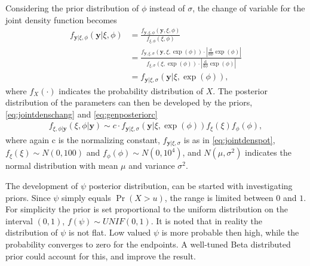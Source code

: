 Considering the prior distribution of $\phi$ instead of $\sigma$, the change of variable for the joint density function becomes 
\begin{align}
f_{\boldsymbol{y}|\xi,\phi}(\boldsymbol{y}|\xi,\phi)&=\frac{f_{\boldsymbol{y},\xi,\phi}(\boldsymbol{y},\xi,\phi)}{f_{\xi,\phi}(\xi,\phi)}\nonumber\\
&=\frac{f_{\boldsymbol{y},\xi,\sigma}\left(\boldsymbol{y},\xi,\exp(\phi)\right)\cdot \left|\frac{\mathrm d}{\mathrm d \phi} \exp(\phi)\right|}{f_{\xi,\sigma}\left(\xi,\exp(\phi)\right)\cdot \left|\frac{\mathrm d}{\mathrm d \phi} \exp(\phi)\right|}\nonumber\\
&=f_{\boldsymbol{y}|\xi,\sigma}\left(\boldsymbol{y}|\xi,\exp(\phi)\right), \label{eq:jointdenschang}
\end{align}
where $f_{X}(\cdot)$ indicates the probability distribution of $X$.
The posterior distribution of the parameters can then be developed by the priors, \eqref{eq:jointdenschang} and \eqref{eq:genposteriorc}
\begin{align}
f_{\xi,\phi|\boldsymbol{y}}(\xi,\phi|\boldsymbol{y})\sim c \cdot f_{\boldsymbol{y}|\xi,\sigma}\left(\boldsymbol{y}|\xi,\exp(\phi)\right)f_{\xi}(\xi)f_{\phi}(\phi), \label{eq:potpost}
\end{align}
where again c is the normalizing constant, $f_{\boldsymbol{y}|\xi,\sigma}$ is as in \eqref{eq:jointdenspot}, $f_{\xi}(\xi)\sim N(0,100)$ and $f_{\phi}(\phi) \sim N(0,10^4)$, and $N(\mu,\sigma^2)$ indicates the normal distribution with mean $\mu$ and variance $\sigma^2$.

The development of $\psi$ posterior distribution, can be started with investigating priors. Since $\psi$ simply equals $\Pr(X>u)$, the range is limited between $0$ and $1$. For simplicity the prior is set proportional to the uniform distribution on the interval $(0,1)$, $f(\psi) \sim UNIF(0,1)$. It is noted that in reality the distribution of $\psi$ is not flat. Low valued $\psi$ is more probable then high, while the probability converges to zero for the endpoints. A well-tuned Beta distributed prior could account for this, and improve the result.

